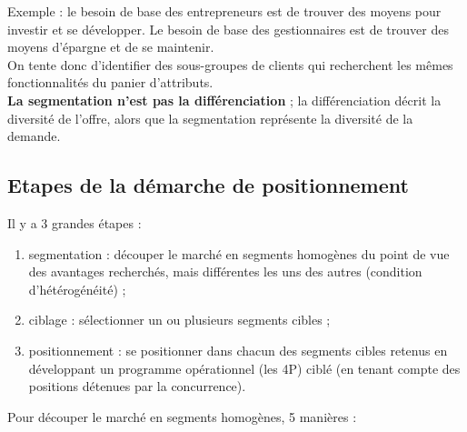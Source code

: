 	Exemple : le besoin de base des entrepreneurs est de trouver des moyens pour investir et se développer. Le besoin de base des gestionnaires est de trouver des moyens d'épargne et de se maintenir. \\
		
	On tente donc d'identifier des sous-groupes de clients qui recherchent les mêmes fonctionnalités du panier d'attributs. \\
		
	\textbf{La segmentation n'est pas la différenciation} ; la différenciation décrit la diversité de l'offre, alors que la segmentation représente la diversité de la demande.

		
		\subsection{Etapes de la démarche de positionnement}
		
		Il y a 3 grandes étapes :
			
		\begin{enumerate}
			\item segmentation : découper le marché en segments homogènes du point de vue des avantages recherchés, mais différentes les uns des autres (condition d'hétérogénéité) ;
			\item ciblage : sélectionner un ou plusieurs segments cibles ;
			\item positionnement : se positionner dans chacun des segments cibles retenus en développant un programme opérationnel (les 4P) ciblé (en tenant compte des positions détenues par la concurrence).
		\end{enumerate}
			
					
			
			
		
		Pour découper le marché en segments homogènes, 5 manières :
			
